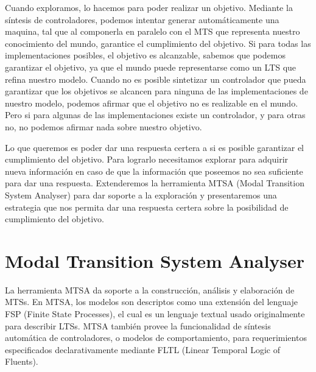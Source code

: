 \vspace{\baselineskip}
Cuando exploramos, lo hacemos para poder realizar un objetivo. Mediante la síntesis de controladores, podemos intentar 
generar automáticamente una maquina, tal que al componerla en paralelo con el MTS que representa nuestro conocimiento 
del mundo, garantice el cumplimiento del objetivo.
Si para todas las implementaciones posibles, el objetivo es alcanzable, sabemos que podemos garantizar el objetivo, ya 
que el mundo puede representarse como un LTS que refina nuestro modelo.
Cuando no es posible sintetizar un controlador que pueda garantizar que los objetivos se alcancen para ninguna de las
implementaciones de nuestro modelo, podemos afirmar que el objetivo no es realizable en el mundo. Pero si para algunas 
de las implementaciones existe un controlador, y para otras no, no podemos afirmar nada sobre nuestro objetivo.

\vspace{\baselineskip}
Lo que queremos es poder dar una respuesta certera a si es posible garantizar el cumplimiento del objetivo.
Para lograrlo necesitamos explorar para adquirir nueva información en caso de que la información que poseemos no sea
suficiente para dar una respuesta. Extenderemos la herramienta MTSA (Modal Transition System Analyser) para dar soporte
a la exploración y presentaremos una estrategia que nos permita dar una respuesta certera sobre la posibilidad de 
cumplimiento del objetivo.

\section{Modal Transition System Analyser}

La herramienta MTSA da soporte a la construcción, análisis y elaboración de MTSs.
En MTSA, los modelos son descriptos como una extensión del lenguaje FSP (Finite State Processes),
el cual es un lenguaje textual usado originalmente para describir LTSs.
MTSA también provee la funcionalidad de síntesis automática de controladores, o modelos de 
comportamiento, para requerimientos especificados declarativamente mediante FLTL (Linear Temporal
Logic of Fluents).